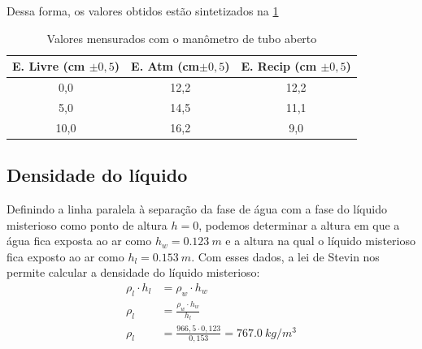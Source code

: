 
Dessa forma, os valores obtidos estão sintetizados na \cref{tab_man}

\begin{table}[H]
    \centering
    \begin{tabular}{c | c | c}
        \hline
        \textbf{E. Livre (cm \(\pm 0,5\))} & \textbf{E. Atm (cm\(\pm 0,5\))} & \textbf{E. Recip (cm \(\pm0,5\))}\\
        \hline
        0,0 & 12,2 & 12,2\\
        \hline
        5,0 & 14,5 & 11,1\\
        \hline
        10,0 & 16,2 & 9,0\\
        \hline
    \end{tabular}
    \caption{Valores mensurados com o manômetro de tubo aberto}
    \label{tab_man}
\end{table}

\subsection{Densidade do líquido}
Definindo a linha paralela à separação da fase de água com a fase do líquido misterioso como ponto de altura \(h = 0\), podemos determinar a altura em que a água fica exposta ao ar como \(h_w = \qty{0,123}{m}\) e a altura na qual o líquido misterioso fica exposto ao ar como \(h_l = \qty{0,153}{m}\). Com esses dados, a lei de Stevin nos permite calcular a densidade do líquido misterioso:
\begin{align*}
    \rho_l \cdot h_l &= \rho_w \cdot h_w\\
    \rho_l &= \frac{\rho_w \cdot h_w}{h_l}\\
    \rho_l &= \frac{966,5 \cdot 0,123}{0,153} = \qty{767,0}{kg/m^3} 
\end{align*}


